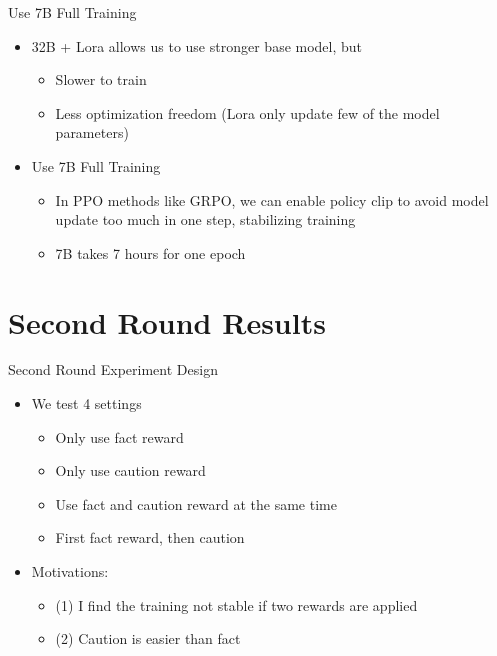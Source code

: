 \documentclass[aspectratio=169]{beamer}
\begin{document}
\begin{frame}{Use 7B Full Training}
    \begin{itemize}
        \item 32B + Lora allows us to use stronger base model, but
        \begin{itemize}
            \item Slower to train
            \item Less optimization freedom (Lora only update few of the model parameters)
        \end{itemize}
        \item Use 7B Full Training
        \begin{itemize}
            \item In PPO methods like GRPO, we can enable policy clip to avoid model update too much in one step, stabilizing training
            \item 7B takes 7 hours for one epoch
        \end{itemize}
    \end{itemize}
\end{frame}

\section{Second Round Results}
\begin{frame}{Second Round Experiment Design}
    \begin{itemize}
        \item We test 4 settings
        \begin{itemize}
            \item Only use fact reward
            \item Only use caution reward
            \item Use fact and caution reward at the same time
            \item First fact reward, then caution
        \end{itemize}
        \item Motivations:
        \begin{itemize}
            \item (1) I find the training not stable if two rewards are applied
            \item (2) Caution is easier than fact
        \end{itemize}
    \end{itemize}
\end{frame}
\end{document}
